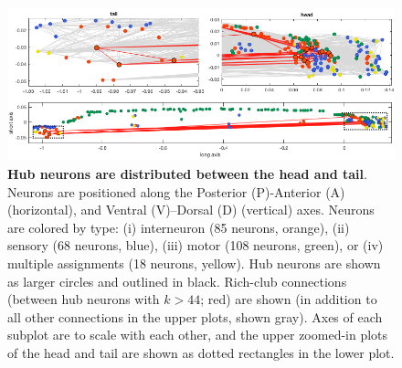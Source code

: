 \documentclass[10pt,letterpaper]{article}
\begin{document}
\begin{figure}[h]
\centering
    \includegraphics[width=1\textwidth]{SpatialPlot.png}
\caption{
\textbf{Hub neurons are distributed between the head and tail}.
Neurons are positioned along the Posterior (P)-Anterior (A) (horizontal), and Ventral (V)--Dorsal (D) (vertical) axes.
Neurons are colored by type:
(i) interneuron (85 neurons, orange),
(ii) sensory (68 neurons, blue),
(iii) motor (108 neurons, green), or
(iv) multiple assignments (18 neurons, yellow).
Hub neurons are shown as larger circles and outlined in black.
Rich-club connections (between hub neurons with $k > 44$; red) are shown (in addition to all other connections in the upper plots, shown gray).
Axes of each subplot are to scale with each other, and the upper zoomed-in plots of the head and tail are shown as dotted rectangles in the lower plot.
\label{fig:neuronsSpace}
}
\end{figure}
\end{document}
